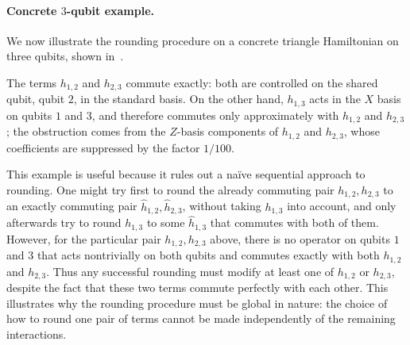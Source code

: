 \documentclass[11pt]{article}
\theoremstyle{plain}
\begin{document}
\paragraph{Concrete $3$-qubit example.}

We now illustrate the rounding procedure on a concrete triangle Hamiltonian
on three qubits, shown in~. 

The terms $h_{1,2}$ and $h_{2,3}$ commute exactly: both are controlled on
the shared qubit, qubit $2$, in the standard basis.  On the other hand,
$h_{1,3}$ acts in the $X$ basis on qubits $1$ and $3$, and therefore
commutes only approximately with $h_{1,2}$ and $h_{2,3}$; the obstruction
comes from the $Z$-basis components of $h_{1,2}$ and $h_{2,3}$, whose
coefficients are suppressed by the factor $1/100$.

This example is useful because it rules out a na\"{i}ve sequential
approach to rounding.  One might try first to round the already commuting
pair $h_{1,2},h_{2,3}$ to an exactly commuting pair
$\hat h_{1,2},\hat h_{2,3}$, without taking $h_{1,3}$ into account, and only
afterwards try to round $h_{1,3}$ to some $\hat h_{1,3}$ that commutes with
both of them.  However, for the particular pair $h_{1,2},h_{2,3}$ above,
there is no operator on qubits $1$ and $3$ that acts nontrivially on both
qubits and commutes exactly with both $h_{1,2}$ and $h_{2,3}$.  Thus any
successful rounding must modify at least one of $h_{1,2}$ or $h_{2,3}$,
despite the fact that these two terms commute perfectly with each other.
This illustrates why the rounding procedure must be global in nature: the
choice of how to round one pair of terms cannot be made independently of
the remaining interactions.


\end{document}
